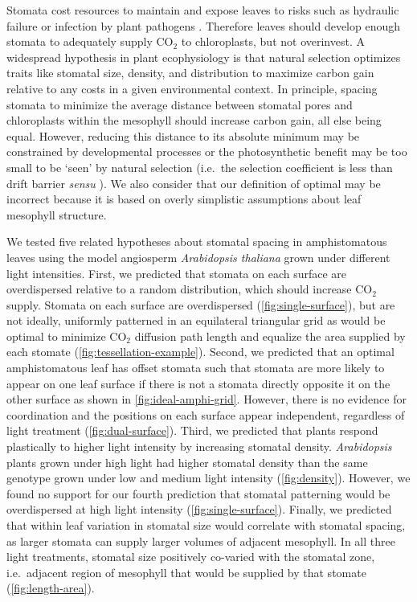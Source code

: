 \documentclass[webpdf,large,modern,unnumsec,namedate]{oup-authoring-template}
\begin{document}
Stomata cost resources to maintain \citep{deans_optimization_2020} and
expose leaves to risks such as hydraulic failure
\citep{wang_theoretical_2020} or infection by plant pathogens
\citep{melotto_stomatal_2017}. Therefore leaves should develop enough
stomata to adequately supply CO\(_2\) to chloroplasts, but not
overinvest. A widespread hypothesis in plant ecophysiology is that
natural selection optimizes traits like stomatal size, density, and
distribution to maximize carbon gain relative to any costs in a given
environmental context. In principle, spacing stomata to minimize the
average distance between stomatal pores and chloroplasts within the
mesophyll should increase carbon gain, all else being equal. However,
reducing this distance to its absolute minimum may be constrained by
developmental processes or the photosynthetic benefit may be too small
to be `seen' by natural selection (i.e.~the selection coefficient is
less than drift barrier \emph{sensu} \citet{sung_drift-barrier_2012}).
We also consider that our definition of optimal may be incorrect because
it is based on overly simplistic assumptions about leaf mesophyll
structure.

We tested five related hypotheses about stomatal spacing in
amphistomatous leaves using the model angiosperm \emph{Arabidopsis
thaliana} grown under different light intensities. First, we predicted
that stomata on each surface are overdispersed relative to a random
distribution, which should increase CO\(_2\) supply. Stomata on each
surface are overdispersed (\autoref{fig:single-surface}), but are not
ideally, uniformly patterned in an equilateral triangular grid as would
be optimal to minimize CO\(_2\) diffusion path length and equalize the
area supplied by each stomate (\autoref{fig:tessellation-example}).
Second, we predicted that an optimal amphistomatous leaf has offset
stomata such that stomata are more likely to appear on one leaf surface
if there is not a stomata directly opposite it on the other surface as
shown in \autoref{fig:ideal-amphi-grid}. However, there is no evidence
for coordination and the positions on each surface appear independent,
regardless of light treatment (\autoref{fig:dual-surface}). Third, we
predicted that plants respond plastically to higher light intensity by
increasing stomatal density. \emph{Arabidopsis} plants grown under high
light had higher stomatal density than the same genotype grown under low
and medium light intensity (\autoref{fig:density}). However, we found no
support for our fourth prediction that stomatal patterning would be
overdispersed at high light intensity (\autoref{fig:single-surface}).
Finally, we predicted that within leaf variation in stomatal size would
correlate with stomatal spacing, as larger stomata can supply larger
volumes of adjacent mesophyll. In all three light treatments, stomatal
size positively co-varied with the stomatal zone, i.e.~adjacent region
of mesophyll that would be supplied by that stomate
(\autoref{fig:length-area}).
\end{document}
